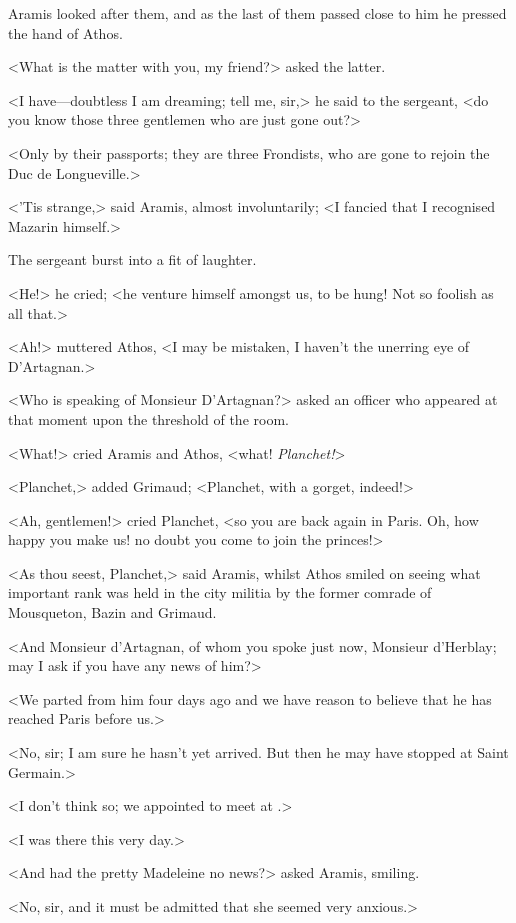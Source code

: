 Aramis looked after them, and as the last of them passed close to him he pressed the hand of Athos.

<What is the matter with you, my friend?> asked the latter.

<I have—doubtless I am dreaming; tell me, sir,> he said to the sergeant, <do you know those three gentlemen who are just gone out?>

<Only by their passports; they are three Frondists, who are gone to rejoin the Duc de Longueville.>

<'Tis strange,> said Aramis, almost involuntarily; <I fancied that I recognised Mazarin himself.>

The sergeant burst into a fit of laughter.

<He!> he cried; <he venture himself amongst us, to be hung! Not so foolish as all that.>

<Ah!> muttered Athos, <I may be mistaken, I haven't the unerring eye of D'Artagnan.>

<Who is speaking of Monsieur D'Artagnan?> asked an officer who appeared at that moment upon the threshold of the room.

<What!> cried Aramis and Athos, <what! \emph{Planchet!}>

<Planchet,> added Grimaud; <Planchet, with a gorget, indeed!>

<Ah, gentlemen!> cried Planchet, <so you are back again in Paris. Oh, how happy you make us! no doubt you come to join the princes!>

<As thou seest, Planchet,> said Aramis, whilst Athos smiled on seeing what important rank was held in the city militia by the former comrade of Mousqueton, Bazin and Grimaud.

<And Monsieur d'Artagnan, of whom you spoke just now, Monsieur d'Herblay; may I ask if you have any news of him?>

<We parted from him four days ago and we have reason to believe that he has reached Paris before us.>

<No, sir; I am sure he hasn't yet arrived. But then he may have stopped at Saint Germain.>

<I don't think so; we appointed to meet at .>

<I was there this very day.>

<And had the pretty Madeleine no news?> asked Aramis, smiling.

<No, sir, and it must be admitted that she seemed very anxious.>

